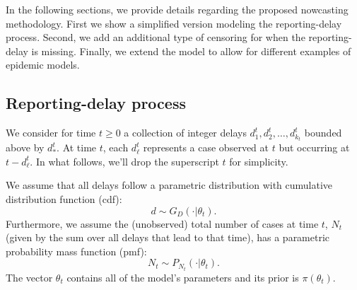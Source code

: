 \documentclass[12pt]{article}
\begin{document}
In the following sections, we provide  details regarding the proposed nowcasting methodology. First we show a simplified version modeling the reporting-delay process. Second, we add an additional type of censoring for when the reporting-delay is missing. Finally, we extend the model to allow for different examples of epidemic models. 



\subsection{Reporting-delay process}

We consider for time $t \geq 0$ a collection of integer delays $d_1^t, d_2^t, \dots, d_{k_t}^t$ bounded above by $d_*^{t}$. At time $t$, each $d_{\ell}^t$ represents a case observed at $t$ but occurring at $t - d_{\ell}^t$. In what follows, we'll drop the superscript $t$ for simplicity. 

We assume that all delays follow a parametric distribution with cumulative distribution function (cdf):
\begin{equation}
d \sim G_D(\cdot|\theta_t).
\end{equation}
Furthermore, we assume the (unobserved) total number of cases at time $t$, $N_t$ (given by the sum over all  delays that lead to that time), has a parametric probability mass function (pmf): 
\begin{equation}
N_t \sim P_{N_t}(\cdot|\theta_t).
\end{equation}
The vector $\theta_t$ contains all of the model's parameters and its prior is $\pi(\theta_t)$. 
\end{document}

